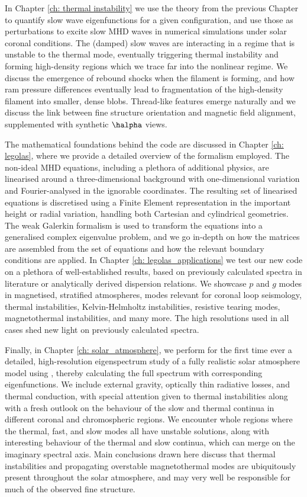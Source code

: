In Chapter \ref{ch: thermal instability} we use the theory from the previous Chapter to quantify slow wave eigenfunctions for a given configuration, and use those as perturbations to excite slow MHD waves in numerical simulations under solar coronal conditions. The (damped) slow waves are interacting in a regime that is unstable to the thermal mode, eventually triggering thermal instability and forming high-density regions which we trace far into the nonlinear regime. We discuss the emergence of rebound shocks when the filament is forming, and how ram pressure differences eventually lead to fragmentation of the high-density filament into smaller, dense blobs. Thread-like features emerge naturally and we discuss the link between fine structure orientation and magnetic field alignment, supplemented with synthetic {$\halpha$} views.

The mathematical foundations behind the {\legolas} code are discussed in Chapter \ref{ch: legolas}, where we provide a detailed overview of the formalism employed. The non-ideal MHD equations, including a plethora of additional physics, are linearised around a three-dimensional background with one-dimensional variation and Fourier-analysed in the ignorable coordinates. The resulting set of linearised equations is discretised using a Finite Element representation in the important height or radial variation, handling both Cartesian and cylindrical geometries. The weak Galerkin formalism is used to transform the equations into a generalised complex eigenvalue problem, and we go in-depth on how the matrices are assembled from the set of equations and how the relevant boundary conditions are applied. In Chapter \ref{ch: legolas_applications} we test our new code on a plethora of well-established results, based on previously calculated spectra in literature or analytically derived dispersion relations. We showcase $p$ and $g$ modes in magnetised, stratified atmospheres, modes relevant for coronal loop seismology, thermal instabilities, Kelvin-Helmholtz instabilities, resistive tearing modes, magnetothermal instabilities, and many more. The high resolutions used in all cases shed new light on previously calculated spectra.

Finally, in Chapter \ref{ch: solar_atmosphere}, we perform for the first time ever a detailed, high-resolution eigenspectrum study of a fully realistic solar atmosphere model using {\legolas}, thereby calculating the full spectrum with corresponding eigenfunctions. We include external gravity, optically thin radiative losses, and thermal conduction, with special attention given to thermal instabilities along with a fresh outlook on the behaviour of the slow and thermal continua in different coronal and chromospheric regions. We encounter whole regions where the thermal, fast, and slow modes all have unstable solutions, along with interesting behaviour of the thermal and slow continua, which can merge on the imaginary spectral axis. Main conclusions drawn here discuss that thermal instabilities and propagating overstable magnetothermal modes are ubiquitously present throughout the solar atmosphere, and may very well be responsible for much of the observed fine structure.

